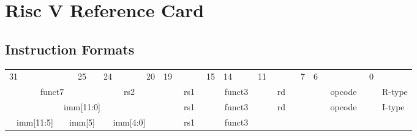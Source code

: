 \vspace*{-2cm}
\section*{Risc V Reference Card}

\subsection*{Instruction Formats}
    \begin{table}[h]
        \scriptsize
        \begin{tabular} %
            {p{0.01mm}p{0.01mm}p{0.01mm}p{0.01mm} p{0.01mm}p{0.01mm}p{0.01mm}p{0.01mm}
             p{0.01mm}p{0.01mm}p{0.01mm}p{0.01mm} p{0.01mm}p{0.01mm}p{0.01mm}p{0.01mm}
             p{0.01mm}p{0.01mm}p{0.01mm}p{0.01mm} p{0.01mm}p{0.01mm}p{0.01mm}p{0.01mm}
             p{0.01mm}p{0.01mm}p{0.01mm}p{0.01mm} p{0.01mm}p{0.01mm}p{0.01mm}p{0.01mm} l}
            \multicolumn{1}{c}{31}&&&&&&
            \multicolumn{1}{c}{25}&
            \multicolumn{1}{c}{24}&&&&
            \multicolumn{1}{c}{20}&
            \multicolumn{1}{c}{19}&&&&
            \multicolumn{1}{c}{15}&
            \multicolumn{1}{c}{14}&&&
            \multicolumn{1}{c}{11}&&&&
            \multicolumn{1}{c}{7}&
            \multicolumn{1}{c}{6}&&&&&&
            \multicolumn{1}{c}{0}&
            \\
            \cline{0-31} 
            \multicolumn{7}{|c|}{funct7} &
            \multicolumn{5}{c|}{rs2}&
            \multicolumn{5}{c|}{rs1}&
            \multicolumn{3}{c|}{funct3}&
            \multicolumn{5}{c|}{rd}&
            \multicolumn{7}{c|}{opcode}&
            R-type
            \\
            \cline{0-31} 
            \multicolumn{12}{|c|}{imm[11:0]} &
            \multicolumn{5}{c|}{rs1}&
            \multicolumn{3}{c|}{funct3}&
            \multicolumn{5}{c|}{rd}&
            \multicolumn{7}{c|}{opcode}&
            I-type
            \\
            \cline{0-31} 
            \multicolumn{6}{|c|}{imm[11:5]} &
            \multicolumn{1}{|c|}{imm[5]} &
            \multicolumn{5}{c|}{imm[4:0]}&
            \multicolumn{5}{c|}{rs1}&
            \multicolumn{3}{c|}{funct3}&

\end{tabular}
\end{table}
